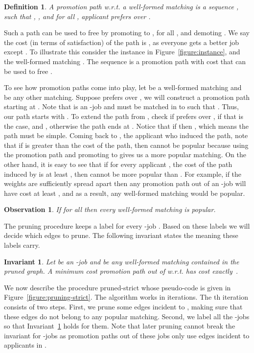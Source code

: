 \documentclass[11pt]{article}
\newcommand{\wrt}{{w.r.t.}\xspace}
\newtheorem{definition}{Definition}
\newtheorem{invariant}{Invariant}
\newtheorem{observation}{Observation}
\begin{document}
{\begin{definition} A promotion path \wrt a well-formed matching  is a sequence , such that ,  , and for all , applicant  prefers  over .
\end{definition}

Such a path can be used to free  by promoting  to , for all , and demoting . We say the cost (in terms of satisfaction) of the path is , as everyone gets a better job except . To illustrate this consider the instance in Figure~\ref{figure:instance}, and the well-formed matching . The sequence  is a promotion path with cost  that can be used to free .

To see how promotion paths come into play, let  be a well-formed matching and  be any other matching. Suppose  prefers  over , we will construct a promotion path starting at . Note that  is an -job and must be matched in  to  such that . Thus, our path starts with . To extend the path from , check if   prefers  over , if that is the case,  and , otherwise the path ends at . Notice that if  then , which means the path must be simple. Coming back to , the applicant who induced the path, note that if  is greater than the cost of the path, then  cannot be popular because using the promotion path and promoting  to  gives us a more popular matching. On the other hand, it is easy to see that if for every applicant , the cost of the path induced by  is at least , then  cannot be more popular than . For example, if the weights are sufficiently spread apart then any promotion path out of an -job will have cost at least , and as a result, any well-formed matching would be popular.

\begin{observation} \label{obs:all-popular} If  for all  then every well-formed matching is popular.
\end{observation}

The pruning procedure keeps a label  for every -job . Based on these labels we will decide which edges to prune. The following invariant states the meaning these labels carry.

\begin{invariant} \label{invariant:label} Let  be an -job and  be any well-formed matching contained in the pruned graph. A minimum cost promotion path out of  \wrt  has cost exactly~.
\end{invariant}

We now describe the procedure {\sc pruned-strict} whose pseudo-code is given in Figure~\ref{figure:pruning-strict}. The algorithm works in iterations. The th iteration consists of two steps. First, we prune some edges incident to , making sure that these edges do not belong to any popular matching. Second, we label all the -jobs so that Invariant~\ref{invariant:label} holds for them. Note that later pruning cannot break the invariant for -jobs as promotion paths out of these jobs only use edges incident to applicants in .

}
\end{document}
